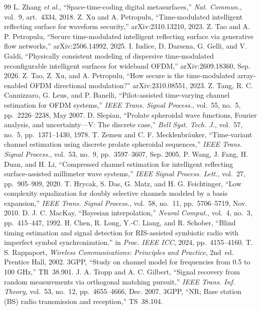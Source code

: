 \documentclass[conference,10pt]{IEEEtran}
\theoremstyle{remark}
\begin{document}
\begin{thebibliography}{99}
 L. Zhang \emph{et al.}, ``Space-time-coding digital metasurfaces,'' \emph{Nat. Commun.}, vol.~9, art.~4334, 2018.
 Z. Xu and A. Petropulu, ``Time-modulated intelligent reflecting surface for waveform security,'' arXiv:2310.13210, 2023.
 Z. Tao and A. P. Petropulu, ``Secure time-modulated intelligent reflecting surface via generative flow networks,'' arXiv:2506.14992, 2025.
 I. Iudice, D. Darsena, G. Gelli, and V. Galdi, ``Physically consistent modeling of dispersive time-modulated reconfigurable intelligent surfaces for wideband OFDM,'' arXiv:2609.18360, Sep. 2026.
 Z. Tao, Z. Xu, and A. Petropulu, ``How secure is the time-modulated array-enabled OFDM directional modulation?'' arXiv:2310.08551, 2023.
 Z. Tang, R. C. Cannizzaro, G. Leus, and P. Banelli, ``Pilot-assisted time-varying channel estimation for OFDM systems,'' \emph{IEEE Trans. Signal Process.}, vol.~55, no.~5, pp.~2226--2238, May 2007.
 D. Slepian, ``Prolate spheroidal wave functions, Fourier analysis, and uncertainty---V: The discrete case,'' \emph{Bell Syst. Tech. J.}, vol.~57, no.~5, pp.~1371--1430, 1978.
 T. Zemen and C. F. Mecklenbr\"auker, ``Time-variant channel estimation using discrete prolate spheroidal sequences,'' \emph{IEEE Trans. Signal Process.}, vol.~53, no.~9, pp.~3597--3607, Sep. 2005.
 P. Wang, J. Fang, H. Duan, and H. Li, ``Compressed channel estimation for intelligent reflecting surface-assisted millimeter wave systems,'' \emph{IEEE Signal Process. Lett.}, vol.~27, pp.~905--909, 2020.
 T. Hrycak, S. Das, G. Matz, and H. G. Feichtinger, ``Low complexity equalization for doubly selective channels modeled by a basis expansion,'' \emph{IEEE Trans. Signal Process.}, vol.~58, no.~11, pp.~5706--5719, Nov. 2010.
 D. J. C. MacKay, ``Bayesian interpolation,'' \emph{Neural Comput.}, vol.~4, no.~3, pp.~415--447, 1992.
 H. Chen, R. Long, Y.-C. Liang, and R. Schober, ``Blind timing estimation and signal detection for RIS-assisted symbiotic radio with imperfect symbol synchronization,'' in \emph{Proc. IEEE ICC}, 2024, pp.~4155--4160.
 T. S. Rappaport, \emph{Wireless Communications: Principles and Practice}, 2nd~ed. Prentice Hall, 2002.
 3GPP, ``Study on channel model for frequencies from 0.5 to 100 GHz,'' TR~38.901.
 J. A. Tropp and A. C. Gilbert, ``Signal recovery from random measurements via orthogonal matching pursuit,'' \emph{IEEE Trans. Inf. Theory}, vol.~53, no.~12, pp.~4655--4666, Dec. 2007.
 3GPP, ``NR; Base station (BS) radio transmission and reception,'' TS~38.104.
\end{thebibliography}
\end{document}
